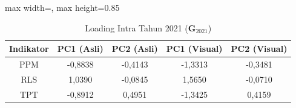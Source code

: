 \begin{table}[H]
\centering
\caption{Loading Intra Tahun 2021 ($\mathbf{G}_{2021}$)} \label{tab:sample2loading_intra_2021}
\begin{adjustbox}{max width=\textwidth, max height=0.85\textheight}
\begin{tabular}{|c|c|c|c|c|}
\hline
\textbf{Indikator} & \textbf{PC1 (Asli)} & \textbf{PC2 (Asli)} & \textbf{PC1 (Visual)} & \textbf{PC2 (Visual)} \\
\hline
PPM & -0,8838 & -0,4143 & -1,3313 & -0,3481 \\
RLS & 1,0390 & -0,0845 & 1,5650 & -0,0710 \\
TPT & -0,8912 & 0,4951 & -1,3425 & 0,4159 \\
\hline
\end{tabular}
\end{adjustbox}
\end{table}
